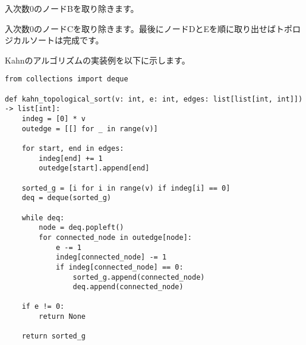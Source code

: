 \documentclass{jlreq}
\begin{document}
\vspace{0.5cm}

入次数0のノードBを取り除きます。


\vspace{0.5cm}

\begin{center}
\end{center}

\vspace{0.5cm}

入次数0のノードCを取り除きます。最後にノードDとEを順に取り出せばトポロジカルソートは完成です。


\vspace{0.5cm}

\begin{center}
\end{center}

\vspace{0.5cm}

Kahnのアルゴリズムの実装例を以下に示します。
\begin{lstlisting}[caption=Kahnのアルゴリズムの実装, label=kahn, frame=TRBL, label={kahn}]
from collections import deque

def kahn_topological_sort(v: int, e: int, edges: list[list[int, int]]) -> list[int]:
    indeg = [0] * v
    outedge = [[] for _ in range(v)]
    
    for start, end in edges:
        indeg[end] += 1
        outedge[start].append[end]
    
    sorted_g = [i for i in range(v) if indeg[i] == 0]
    deq = deque(sorted_g)
    
    while deq:
        node = deq.popleft()
        for connected_node in outedge[node]:
            e -= 1
            indeg[connected_node] -= 1
            if indeg[connected_node] == 0: 
                sorted_g.append(connected_node)
                deq.append(connected_node)
    
    if e != 0:
        return None
    
    return sorted_g
\end{lstlisting}
\end{document}
